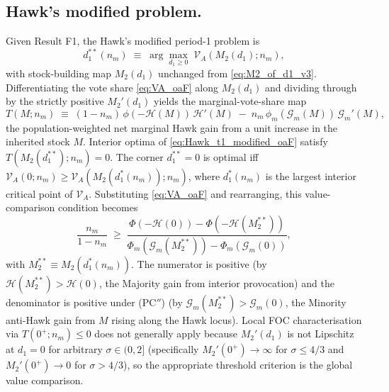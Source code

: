 \documentclass[11pt,twoside]{extarticle}
\begin{document}
\subsection*{Hawk's modified problem.} Given Result F1, the Hawk's modified period-1 problem is
\begin{equation}\label{eq:Hawk_t1_modified_oaF}
    d_1^{**}(n_m)\;\equiv\;\arg\max_{d_1\ge 0}\;\mathcal V_A(M_2(d_1);n_m),
\end{equation}
with stock-building map $M_2(d_1)$ unchanged from \autoref{eq:M2_of_d1_v3}. Differentiating the vote share \autoref{eq:VA_oaF} along $M_2(d_1)$ and dividing through by the strictly positive $M_2'(d_1)$ yields the marginal-vote-share map
\begin{equation}\label{eq:T_map_oaF}
    T(M;n_m)\;\equiv\;(1-n_m)\,\phi(-\mathcal H(M))\,\mathcal H'(M)\;-\;n_m\,\phi_m(\mathcal G_m(M))\,\mathcal G_m'(M),
\end{equation}
the population-weighted net marginal Hawk gain from a unit increase in the inherited stock $M$. Interior optima of \autoref{eq:Hawk_t1_modified_oaF} satisfy $T(M_2(d_1^{**});n_m)=0$. The corner $d_1^{**}=0$ is optimal iff $\mathcal V_A(0;n_m)\ge\mathcal V_A(M_2(d_1^{*}(n_m));n_m)$, where $d_1^{*}(n_m)$ is the largest interior critical point of $\mathcal V_A$. Substituting \autoref{eq:VA_oaF} and rearranging, this value-comparison condition becomes
\begin{equation}\label{eq:corner_threshold_oaF}
    \frac{n_m}{1-n_m}\;\ge\;\frac{\Phi(-\mathcal H(0))-\Phi(-\mathcal H(M_2^{**}))}{\Phi_m(\mathcal G_m(M_2^{**}))-\Phi_m(\mathcal G_m(0))},
\end{equation}
with $M_2^{**}\equiv M_2(d_1^{*}(n_m))$. The numerator is positive (by $\mathcal H(M_2^{**})>\mathcal H(0)$, the Majority gain from interior provocation) and the denominator is positive under (PC$''$) (by $\mathcal G_m(M_2^{**})>\mathcal G_m(0)$, the Minority anti-Hawk gain from $M$ rising along the Hawk locus). Local FOC characterisation via $T(0^+;n_m)\le 0$ does not generally apply because $M_2'(d_1)$ is not Lipschitz at $d_1=0$ for arbitrary $\sigma\in(0,2]$ (specifically $M_2'(0^+)\to\infty$ for $\sigma\le 4/3$ and $M_2'(0^+)\to 0$ for $\sigma>4/3$), so the appropriate threshold criterion is the global value comparison.
\end{document}
